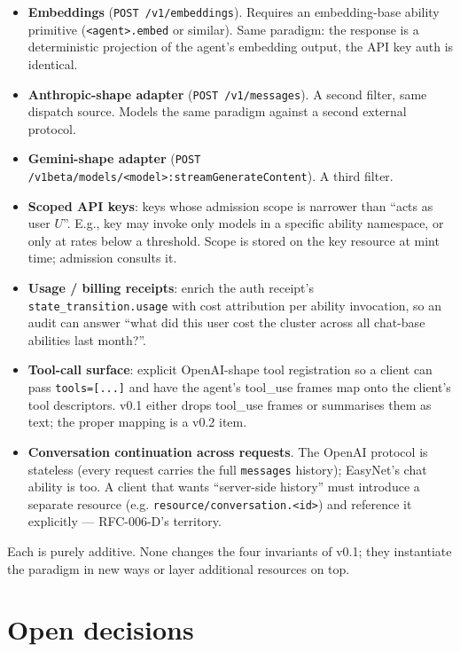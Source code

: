 \documentclass[11pt,a4paper]{article}
\theoremstyle{definition}
\begin{document}
\begin{itemize}[leftmargin=2em,itemsep=0.15em]
    \item \textbf{Embeddings} (\texttt{POST /v1/embeddings}).
    Requires an embedding-base ability primitive
    (\texttt{<agent>.embed} or similar). Same paradigm: the
    response is a deterministic projection of the agent's
    embedding output, the API key auth is identical.
    \item \textbf{Anthropic-shape adapter}
    (\texttt{POST /v1/messages}). A second filter, same
    dispatch source. Models the same paradigm against a
    second external protocol.
    \item \textbf{Gemini-shape adapter}
    (\texttt{POST /v1beta/models/<model>:streamGenerateContent}).
    A third filter.
    \item \textbf{Scoped API keys}: keys whose admission scope
    is narrower than ``acts as user $U$''. E.g., key may invoke
    only models in a specific ability namespace, or only at
    rates below a threshold. Scope is stored on the key
    resource at mint time; admission consults it.
    \item \textbf{Usage / billing receipts}: enrich the auth
    receipt's \texttt{state\_transition.usage} with cost
    attribution per ability invocation, so an audit can
    answer ``what did this user cost the cluster across all
    chat-base abilities last month?''.
    \item \textbf{Tool-call surface}: explicit OpenAI-shape
    tool registration so a client can pass \texttt{tools=[...]}
    and have the agent's tool\_use frames map onto the client's
    tool descriptors. v0.1 either drops tool\_use frames or
    summarises them as text; the proper mapping is a v0.2 item.
    \item \textbf{Conversation continuation across requests}.
    The OpenAI protocol is stateless (every request carries the
    full \texttt{messages} history); EasyNet's chat ability is
    too. A client that wants ``server-side history'' must
    introduce a separate resource (e.g.
    \texttt{resource/conversation.<id>}) and reference it
    explicitly --- RFC-006-D's territory.
\end{itemize}

Each is purely additive. None changes the four invariants of
v0.1; they instantiate the paradigm in new ways or layer
additional resources on top.

\section{Open decisions}
\label{sec:open}
\end{document}
